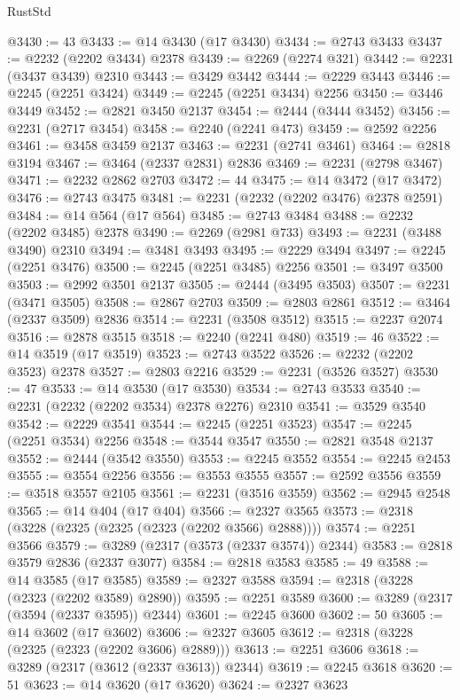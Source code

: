 \begin{lexlean}{RustStd}
\begin{coremodule}
@3430 := 43
@3433 := @14 @3430 (@17 @3430)
@3434 := @2743 @3433
@3437 := @2232 (@2202 @3434) @2378
@3439 := @2269 (@2274 @321)
@3442 := @2231 (@3437 @3439) @2310
@3443 := @3429 @3442
@3444 := @2229 @3443
@3446 := @2245 (@2251 @3424)
@3449 := @2245 (@2251 @3434) @2256
@3450 := @3446 @3449
@3452 := @2821 @3450 @2137
@3454 := @2444 (@3444 @3452)
@3456 := @2231 (@2717 @3454)
@3458 := @2240 (@2241 @473)
@3459 := @2592 @2256
@3461 := @3458 @3459 @2137
@3463 := @2231 (@2741 @3461)
@3464 := @2818 @3194
@3467 := @3464 (@2337 @2831) @2836
@3469 := @2231 (@2798 @3467)
@3471 := @2232 @2862 @2703
@3472 := 44
@3475 := @14 @3472 (@17 @3472)
@3476 := @2743 @3475
@3481 := @2231 (@2232 (@2202 @3476) @2378 @2591)
@3484 := @14 @564 (@17 @564)
@3485 := @2743 @3484
@3488 := @2232 (@2202 @3485) @2378
@3490 := @2269 (@2981 @733)
@3493 := @2231 (@3488 @3490) @2310
@3494 := @3481 @3493
@3495 := @2229 @3494
@3497 := @2245 (@2251 @3476)
@3500 := @2245 (@2251 @3485) @2256
@3501 := @3497 @3500
@3503 := @2992 @3501 @2137
@3505 := @2444 (@3495 @3503)
@3507 := @2231 (@3471 @3505)
@3508 := @2867 @2703
@3509 := @2803 @2861
@3512 := @3464 (@2337 @3509) @2836
@3514 := @2231 (@3508 @3512)
@3515 := @2237 @2074
@3516 := @2878 @3515
@3518 := @2240 (@2241 @480)
@3519 := 46
@3522 := @14 @3519 (@17 @3519)
@3523 := @2743 @3522
@3526 := @2232 (@2202 @3523) @2378
@3527 := @2803 @2216
@3529 := @2231 (@3526 @3527)
@3530 := 47
@3533 := @14 @3530 (@17 @3530)
@3534 := @2743 @3533
@3540 := @2231 (@2232 (@2202 @3534) @2378 @2276) @2310
@3541 := @3529 @3540
@3542 := @2229 @3541
@3544 := @2245 (@2251 @3523)
@3547 := @2245 (@2251 @3534) @2256
@3548 := @3544 @3547
@3550 := @2821 @3548 @2137
@3552 := @2444 (@3542 @3550)
@3553 := @2245 @3552
@3554 := @2245 @2453
@3555 := @3554 @2256
@3556 := @3553 @3555
@3557 := @2592 @3556
@3559 := @3518 @3557 @2105
@3561 := @2231 (@3516 @3559)
@3562 := @2945 @2548
@3565 := @14 @404 (@17 @404)
@3566 := @2327 @3565
@3573 := @2318 (@3228 (@2325 (@2325 (@2323 (@2202 @3566) @2888))))
@3574 := @2251 @3566
@3579 := @3289 (@2317 (@3573 (@2337 @3574)) @2344)
@3583 := @2818 @3579 @2836 (@2337 @3077)
@3584 := @2818 @3583
@3585 := 49
@3588 := @14 @3585 (@17 @3585)
@3589 := @2327 @3588
@3594 := @2318 (@3228 (@2323 (@2202 @3589) @2890))
@3595 := @2251 @3589
@3600 := @3289 (@2317 (@3594 (@2337 @3595)) @2344)
@3601 := @2245 @3600
@3602 := 50
@3605 := @14 @3602 (@17 @3602)
@3606 := @2327 @3605
@3612 := @2318 (@3228 (@2325 (@2323 (@2202 @3606) @2889)))
@3613 := @2251 @3606
@3618 := @3289 (@2317 (@3612 (@2337 @3613)) @2344)
@3619 := @2245 @3618
@3620 := 51
@3623 := @14 @3620 (@17 @3620)
@3624 := @2327 @3623

\end{coremodule}
\end{lexlean}
